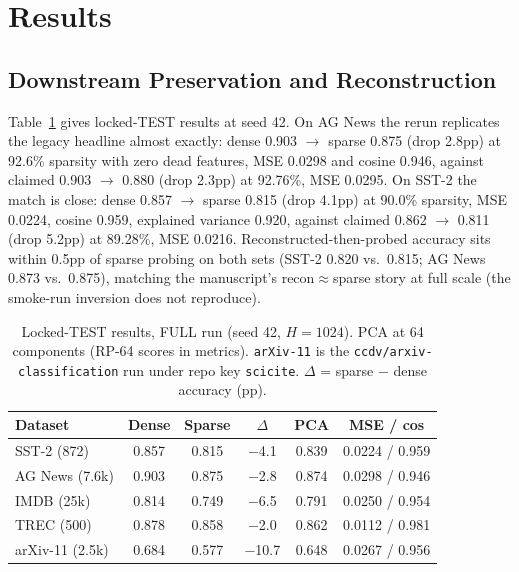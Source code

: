 \documentclass[conference]{IEEEtran}
\begin{document}
\section{Results}
\label{sec:results}
\subsection{Downstream Preservation and Reconstruction}
Table~\ref{tab:main} gives locked-TEST results at seed 42. On AG News the
rerun replicates the legacy headline almost exactly: dense 0.903
$\rightarrow$ sparse 0.875 (drop 2.8pp) at 92.6\% sparsity with zero dead
features, MSE 0.0298 and cosine 0.946, against claimed 0.903 $\rightarrow$
0.880 (drop 2.3pp) at 92.76\%, MSE 0.0295. On SST-2 the match is close:
dense 0.857 $\rightarrow$ sparse 0.815 (drop 4.1pp) at 90.0\% sparsity, MSE
0.0224, cosine 0.959, explained variance 0.920, against claimed 0.862
$\rightarrow$ 0.811 (drop 5.2pp) at 89.28\%, MSE 0.0216. Reconstructed-then-probed
accuracy sits within 0.5pp of sparse probing on both sets (SST-2 0.820 vs.\
0.815; AG News 0.873 vs.\ 0.875), matching the manuscript's recon$\approx$sparse
story at full scale (the smoke-run inversion does not reproduce).

\begin{table}[t]
\caption{Locked-TEST results, FULL run (seed 42, $H=1024$). PCA at 64 components (RP-64 scores in metrics). \texttt{arXiv-11} is the \texttt{ccdv/arxiv-classification} run under repo key \texttt{scicite}. $\Delta$ = sparse $-$ dense accuracy (pp).}
\label{tab:main}
\centering
\begin{tabular}{lccccc}
\hline
\textbf{Dataset} & \textbf{Dense} & \textbf{Sparse} & \textbf{$\Delta$} & \textbf{PCA} & \textbf{MSE / cos} \\
\hline
SST-2 (872) & 0.857 & 0.815 & $-$4.1 & 0.839 & 0.0224 / 0.959 \\
AG News (7.6k) & 0.903 & 0.875 & $-$2.8 & 0.874 & 0.0298 / 0.946 \\
IMDB (25k) & 0.814 & 0.749 & $-$6.5 & 0.791 & 0.0250 / 0.954 \\
TREC (500) & 0.878 & 0.858 & $-$2.0 & 0.862 & 0.0112 / 0.981 \\
arXiv-11 (2.5k) & 0.684 & 0.577 & $-$10.7 & 0.648 & 0.0267 / 0.956 \\
\hline
\end{tabular}
\end{table}
\end{document}
